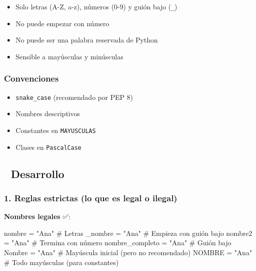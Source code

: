 \documentclass[
  doc,
  floatsintext,
  longtable,
  a4paper,
  nolmodern,
  notxfonts,
  notimes,
  12pt,
  colorlinks=true,linkcolor=blue,citecolor=blue,urlcolor=blue]{apa7}
\newenvironment{Shaded}{\begin{snugshade}}{\end{snugshade}}
\newcommand{\CommentTok}[1]{\textcolor[rgb]{0.37,0.37,0.37}{#1}}
\newcommand{\NormalTok}[1]{\textcolor[rgb]{0.00,0.23,0.31}{#1}}
\newcommand{\OperatorTok}[1]{\textcolor[rgb]{0.37,0.37,0.37}{#1}}
\newcommand{\StringTok}[1]{\textcolor[rgb]{0.13,0.47,0.30}{#1}}
\providecommand{\tightlist}{%
  \setlength{\itemsep}{0pt}\setlength{\parskip}{0pt}}
\begin{document}
\begin{itemize}
\tightlist
\item
  Solo letras (A-Z, a-z), números (0-9) y guión bajo (\texttt{\_})
\item
  No puede empezar con número
\item
  No puede ser una palabra reservada de Python
\item
  Sensible a mayúsculas y minúsculas
\end{itemize}

\subsubsection{Convenciones}\label{convenciones}

\begin{itemize}
\tightlist
\item
  \texttt{snake\_case} (recomendado por PEP 8)
\item
  Nombres descriptivos
\item
  Constantes en \texttt{MAYUSCULAS}
\item
  Clases en \texttt{PascalCase}
\end{itemize}

\subsection{📐 Desarrollo}\label{desarrollo}

\subsubsection{1. Reglas estrictas (lo que es legal o
ilegal)}\label{reglas-estrictas-lo-que-es-legal-o-ilegal}

\textbf{Nombres legales} ✅:

\begin{Shaded}
\begin{Highlighting}[]
\NormalTok{nombre }\OperatorTok{=} \StringTok{"Ana"}        \CommentTok{\# Letras}
\NormalTok{\_nombre }\OperatorTok{=} \StringTok{"Ana"}       \CommentTok{\# Empieza con guión bajo}
\NormalTok{nombre2 }\OperatorTok{=} \StringTok{"Ana"}       \CommentTok{\# Termina con número}
\NormalTok{nombre\_completo }\OperatorTok{=} \StringTok{"Ana"}  \CommentTok{\# Guión bajo}
\NormalTok{Nombre }\OperatorTok{=} \StringTok{"Ana"}        \CommentTok{\# Mayúscula inicial (pero no recomendado)}
\NormalTok{NOMBRE }\OperatorTok{=} \StringTok{"Ana"}        \CommentTok{\# Todo mayúsculas (para constantes)}
\end{Highlighting}
\end{Shaded}
\end{document}

